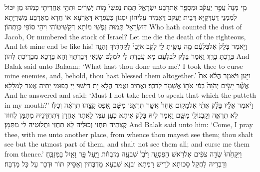 {מִ֤י מָנָה֙ עֲפַ֣ר יַעֲקֹ֔ב וּמִסְפָּ֖ר אֶת\maqqaf רֹ֣בַע יִשְׂרָאֵ֑ל תָּמֹ֤ת נַפְשִׁי֙ מ֣וֹת יְשָׁרִ֔ים וּתְהִ֥י אַחֲרִיתִ֖י כָּמֹֽהוּ׃}
{מַן יִכּוֹל לְמִמְנֵי דַּעְדְּקַיָּא דְּבֵית יַעֲקֹב דַּאֲמִיר עֲלֵיהוֹן יִסְגּוֹן כְּעַפְרָא דְּאַרְעָא אוֹ חֲדָא מֵאַרְבַּע מַשְׁרְיָתָא דְּיִשְׂרָאֵל תְּמוּת נַפְשִׁי מוֹתָא דְּקַשִּׁיטוֹהִי וִיהֵי סוֹפִי כְּוָתְהוֹן׃}
{Who hath counted the dust of Jacob, Or numbered the stock of Israel? Let me die the death of the righteous, And let mine end be like his!}{}
{וַיֹּ֤אמֶר בָּלָק֙ אֶל\maqqaf בִּלְעָ֔ם מֶ֥ה עָשִׂ֖יתָ לִ֑י לָקֹ֤ב אֹיְבַי֙ לְקַחְתִּ֔יךָ וְהִנֵּ֖ה בֵּרַ֥כְתָּ בָרֵֽךְ׃}
{וַאֲמַר בָּלָק לְבִלְעָם מָא עֲבַדְתְּ לִי לִמְלָט שָׂנְאַי דְּבַרְתָּךְ וְהָא בָּרָכָא מְבָרֵיכְתְּ לְהוֹן׃}
{And Balak said unto Balaam: ‘What hast thou done unto me? I took thee to curse mine enemies, and, behold, thou hast blessed them altogether.’}{}
{וַיַּ֖עַן וַיֹּאמַ֑ר הֲלֹ֗א אֵת֩ אֲשֶׁ֨ר יָשִׂ֤ים יְהֹוָה֙ בְּפִ֔י אֹת֥וֹ אֶשְׁמֹ֖ר לְדַבֵּֽר׃}
{וַאֲתֵיב וַאֲמַר הֲלָא יָת דִּישַׁוֵּי יְיָ בְּפוּמִּי יָתֵיהּ אֶטַּר לְמַלָּלָא׃}
{And he answered and said: ‘Must I not take heed to speak that which the \lord\space putteth in my mouth?’}{}
{וַיֹּ֨אמֶר אֵלָ֜יו בָּלָ֗ק  אִתִּ֜י אֶל\maqqaf מָק֤וֹם אַחֵר֙ אֲשֶׁ֣ר תִּרְאֶ֣נּוּ מִשָּׁ֔ם אֶ֚פֶס קָצֵ֣הוּ תִרְאֶ֔ה וְכֻלּ֖וֹ לֹ֣א תִרְאֶ֑ה וְקׇבְנוֹ\maqqaf לִ֖י מִשָּֽׁם׃}
{וַאֲמַר לֵיהּ בָּלָק אֵיתַא כְעַן עִמִּי לַאֲתַר אָחֳרָן דְּתִחְזֵינֵיהּ מִתַּמָּן לְחוֹד קְצָתֵיהּ תִּחְזֵי וְכוּלֵּיהּ לָא תִחְזֵי וּתְלוּטֵיהּ לִי מִתַּמָּן׃}
{And Balak said unto him: ‘Come, I pray thee, with me unto another place, from whence thou mayest see them; thou shalt see but the utmost part of them, and shalt not see them all; and curse me them from thence.’}{}
{וַיִּקָּחֵ֙הוּ֙ שְׂדֵ֣ה צֹפִ֔ים אֶל\maqqaf רֹ֖אשׁ הַפִּסְגָּ֑ה וַיִּ֙בֶן֙ שִׁבְעָ֣ה מִזְבְּחֹ֔ת וַיַּ֛עַל פָּ֥ר וָאַ֖יִל בַּמִּזְבֵּֽחַ׃}
{וְדַבְרֵיהּ לַחֲקַל סָכוּתָא לְרֵישׁ רָמְתָא וּבְנָא שִׁבְעָא מַדְבְּחִין וְאַסֵּיק תּוֹר וּדְכַר עַל כָּל מַדְבַּח׃}
